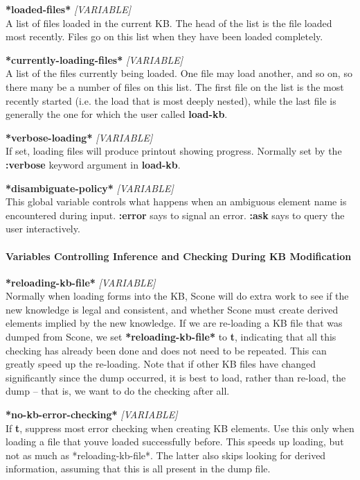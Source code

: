\documentclass[titlepage,twoside,openright,11pt]{article}
\begin{document}
\textbf{*loaded-files*} \emph{{[}VARIABLE{]}}\\
A list of files loaded in the current KB. The head of the list is the
file loaded most recently. Files go on this list when they have been
loaded completely.

\textbf{*currently-loading-files*} \emph{{[}VARIABLE{]}}\\
A list of the files currently being loaded. One file may load another,
and so on, so there many be a number of files on this list. The first
file on the list is the most recently started (i.e. the load that is
most deeply nested), while the last file is generally the one for which
the user called \textbf{load-kb}.

\textbf{*verbose-loading*} \emph{{[}VARIABLE{]}}\\
If set, loading files will produce printout showing progress. Normally
set by the \textbf{:verbose} keyword argument in \textbf{load-kb}.

\textbf{*disambiguate-policy*} \emph{{[}VARIABLE{]}}\\
This global variable controls what happens when an ambiguous element
name is encountered during input. \textbf{:error} says to signal an
error. \textbf{:ask} says to query the user interactively.

\paragraph{Variables Controlling Inference and Checking During KB
Modification}\label{variables-controlling-inference-and-checking-during-kb-modification}

\textbf{*reloading-kb-file*} \emph{{[}VARIABLE{]}}\\
Normally when loading forms into the KB, Scone will do extra work to see
if the new knowledge is legal and consistent, and whether Scone must
create derived elements implied by the new knowledge. If we are
re-loading a KB file that was dumped from Scone, we set
\textbf{*reloading-kb-file*} to \textbf{t}, indicating that all this
checking has already been done and does not need to be repeated. This
can greatly speed up the re-loading. Note that if other KB files have
changed significantly since the dump occurred, it is best to load,
rather than re-load, the dump -- that is, we want to do the checking
after all.

\textbf{*no-kb-error-checking*} \emph{{[}VARIABLE{]}}\\
If \textbf{t}, suppress most error checking when creating KB elements.
Use this only when loading a file that you\textquotesingle ve loaded
successfully before. This speeds up loading, but not as much as
*reloading-kb-file*. The latter also skips looking for derived
information, assuming that this is all present in the dump file.
\end{document}
